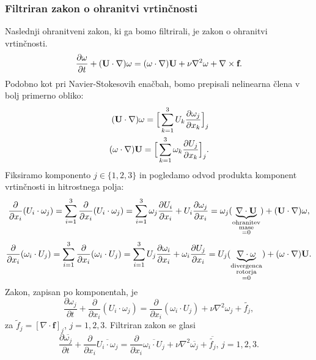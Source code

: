 \documentclass[mat2, tisk]{fmfdelo}
\newcommand{\bd}{\textbf}
\begin{document}
\subsubsection{Filtriran zakon o ohranitvi vrtinčnosti}

Naslednji ohranitveni zakon, ki ga bomo filtrirali, je zakon o ohranitvi vrtinčnosti.
$$
\frac{\partial \text{\bd{$\omega$}}}{\partial t} + (\bd{U}\cdot \nabla)\text{\bd{$\omega$}} = (\text{\bd{$\omega$}} \cdot \nabla)\bd{U} + \nu \nabla^2 \text{\bd{$\omega$}} + \nabla \times \bd{f}. 
$$
Podobno kot pri Navier-Stokesovih enačbah, bomo prepisali nelinearna člena v bolj primerno 
obliko:
\begin{align*}
(\bd{U} \cdot \nabla) \text{\bd{$\omega$}} = \Big[\sum_{k=1}^3 U_k \frac{\partial \omega_j}{\partial x_k}\Big]_j\\
(\text{\bd{$\omega$}} \cdot \nabla) \bd{U} = \Big[\sum_{k=1}^3 \omega_k \frac{\partial U_j}{\partial x_k}\Big]_j.
\end{align*}
Fiksiramo komponento $j\in\{1, 2, 3\}$ in pogledamo odvod produkta komponent vrtinčnosti in hitrostnega polja:
\begin{align*}
\frac{\partial}{\partial x_i} (U_i \cdot\omega_j) = \sum_{i=1}^3 \frac{\partial}{\partial x_i} (U_i \cdot\omega_j) = 
\sum_{i=1}^3 \omega_j\frac{\partial U_i}{\partial x_i} + U_i\frac{\partial \omega_j}{\partial x_i} = 
\omega_j (\underbrace{\nabla \cdot \bd{U}}_{\substack{\text{ohranitev}\\\text{mase}\\=0}}) + (\bd{U}\cdot\nabla)\text{\bd{$\omega$}},
\end{align*}
\begin{align*}
\frac{\partial}{\partial x_i} (\omega_i \cdot U_j) = \sum_{i=1}^3 \frac{\partial}{\partial x_i} (\omega_i \cdot U_j) = 
\sum_{i=1}^3 U_j\frac{\partial \omega_i}{\partial x_i} + \omega_i\frac{\partial U_j}{\partial x_i} = 
U_j (\underbrace{\nabla \cdot \text{\bd{$\omega$}}}_{\substack{\text{divergenca}\\\text{rotorja}\\=0}}) + (\text{\bd{$\omega$}}\cdot\nabla)\text{\bd{U}}.
\end{align*}
Zakon, zapisan po komponentah, je
\begin{equation*}
\frac{\partial \omega_j}{\partial t} + \frac{\partial}{\partial x_i} (U_i \cdot \omega_j) = 
\frac{\partial}{\partial x_i} (\omega_i \cdot U_j) + \nu \nabla^2 \omega_j + \tilde{f_j},
\end{equation*}
za $\tilde{f}_j = [\nabla \cdot \bd{f}]_j$, $j = 1, 2, 3$.
Filtriran zakon se glasi
\begin{equation*}
  \frac{\partial \overline{\omega_j}}{\partial t} + \frac{\partial}{\partial x_i} \overline{U_i \cdot \omega_j} = 
  \frac{\partial}{\partial x_i} \overline{\omega_i \cdot U_j} + \nu \nabla^2 \overline{\omega_j} + \overline{\tilde{f_j}}, \, j = 1, 2, 3.
\end{equation*}
\end{document}
